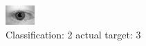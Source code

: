 \begin{figure}[h!]
\begin{center}
\includegraphics[width=0.60\columnwidth]{figures/ID637_class_2_target_3.png}
\end{center}
\caption{ Classification: 2 actual target: 3}
\label{fig:ID637_class_2_target_3}
\end{figure}
